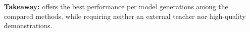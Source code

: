 \begin{tcolorbox}[
  colback=lightblue!50,
  colframe=vividblue,
  boxrule=0.8pt,
  arc=2pt,
  left=6pt,
  right=6pt,
  top=4pt,
  bottom=4pt
]
 \textbf{Takeaway:} \ours{} offers the best performance per model generations among the compared methods, while requiring neither an external teacher nor high-quality demonstrations.
\end{tcolorbox}










